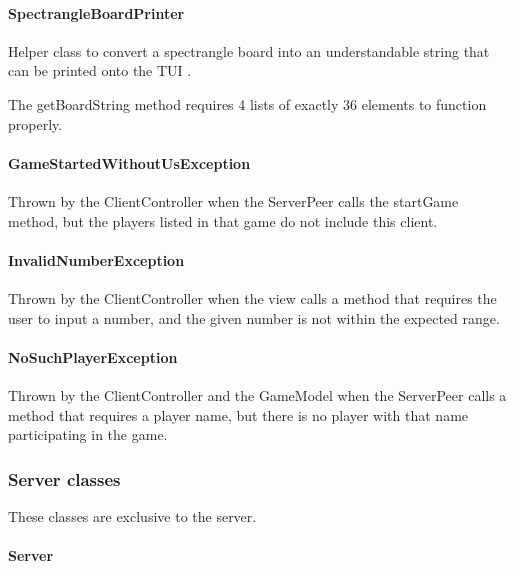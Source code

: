 \documentclass[12pt, letterpaper]{article}
\begin{document}
    \paragraph{SpectrangleBoardPrinter}
    Helper class to convert a spectrangle board into an understandable string that can be printed onto the TUI .

    The getBoardString method requires 4 lists of exactly 36 elements to function properly.

    \paragraph{GameStartedWithoutUsException}
    Thrown by the ClientController when the ServerPeer calls the startGame method, but the
    players listed in that game do not include this client.

    \paragraph{InvalidNumberException}
    Thrown by the ClientController when the view calls a method that requires the user to input a number, and
    the given number is not within the expected range.

    \paragraph{NoSuchPlayerException}
    Thrown by the ClientController and the GameModel when the ServerPeer calls a method that requires a player name,
    but there is no player with that name participating in the game.



    \subsubsection{Server classes}

    These classes are exclusive to the server.


    \paragraph{Server}
\end{document}
